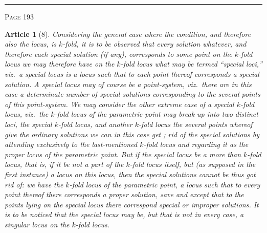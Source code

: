 \documentclass[11pt,a4paper]{article}
\theoremstyle{cayley}
\newtheorem{art}{Article}
\begin{document}
\vspace{1em}
\noindent\rule{\textwidth}{0.4pt}
\begin{center}\textsc{Page 193}\end{center}
\newpage

\begin{art}[8]
Considering the general case where the condition, and therefore also the locus, is $k$-fold, it is to be observed that every solution whatever, and therefore each special solution (if any), corresponds to some point on the $k$-fold locus we may therefore have on the $k$-fold locus what may be termed ``special loci,'' viz.\ a special locus is a locus such that to each point thereof corresponds a special solution. A special locus may of course be a point-system, viz.\ there are in this case a determinate number of special solutions corresponding to the several points of this point-system. We may consider the other extreme case of a special $k$-fold locus, viz.\ the $k$-fold locus of the parametric point may break up into two distinct loci, the special $k$-fold locus, and another $k$-fold locus the several points whereof give the ordinary solutions we can in this case get ; rid of the special solutions by attending exclusively to the last-mentioned $k$-fold locus and regarding it as the proper locus of the parametric point. But if the special locus be a more than $k$-fold locus, that is, if it be not a part of the $k$-fold locus itself, but (as supposed in the first instance) a locus on this locus, then the special solutions cannot be thus got rid of: we have the $k$-fold locus of the parametric point, a locus such that to every point thereof there corresponds a proper solution, save and except that to the points lying on the special locus there correspond special or improper solutions. It is to be noticed that the special locus may be, but that is not in every case, a singular locus on the $k$-fold locus.
\end{art}
\end{document}
